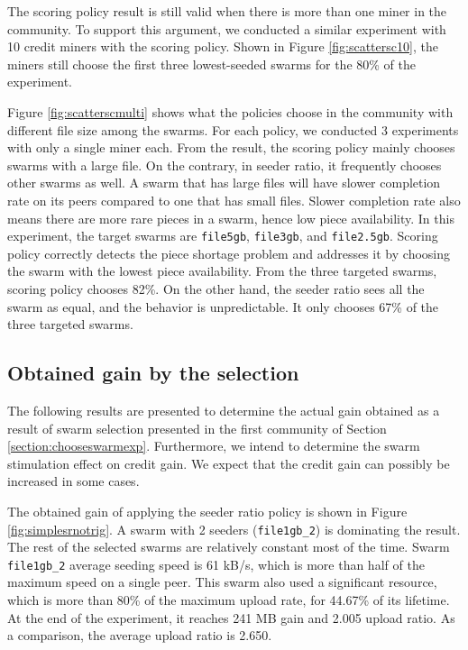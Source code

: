 The scoring policy result is still valid when there is more than one miner in the community. To support this argument, we conducted a similar experiment with 10 credit miners with the scoring policy. Shown in Figure \ref{fig:scattersc10}, the miners still choose the first three lowest-seeded swarms for the 80\% of the experiment. 

Figure \ref{fig:scatterscmulti} shows what the policies choose in the community with different file size among the swarms. For each policy, we conducted 3 experiments with only a single miner each. From the result, the scoring policy mainly chooses swarms with a large file. On the contrary, in seeder ratio, it frequently chooses other swarms as well. A swarm that has large files will have slower completion rate on its peers compared to one that has small files. Slower completion rate also means there are more rare pieces in a swarm, hence low piece availability. In this experiment, the target swarms are \texttt{file5gb}, \texttt{file3gb}, and \texttt{file2.5gb}. Scoring policy correctly detects the piece shortage problem and addresses it by choosing the swarm with the lowest piece availability. From the three targeted swarms, scoring policy chooses 82\%. On the other hand, the seeder ratio sees all the swarm as equal, and the behavior is unpredictable. It only chooses 67\% of the three targeted swarms.

\subsection{Obtained gain by the selection}
\label{section:resultgain}
The following results are presented to determine the actual gain obtained as a result of swarm selection presented in the first community of Section \ref{section:chooseswarmexp}. Furthermore, we intend to determine the swarm stimulation effect on credit gain. We expect that the credit gain can possibly be increased in some cases.


The obtained gain of applying the seeder ratio policy is shown in Figure \ref{fig:simplesrnotrig}. A swarm with 2 seeders (\texttt{file1gb\_2}) is dominating the result. The rest of the selected swarms are relatively constant most of the time. Swarm \texttt{file1gb\_2} average seeding speed is 61 kB/s, which is more than half of the maximum speed on a single peer. This swarm also used a significant resource, which is more than 80\% of the maximum upload rate, for 44.67\% of its lifetime. At the end of the experiment, it reaches 241 MB gain and 2.005 upload ratio. As a comparison, the average upload ratio is 2.650.

